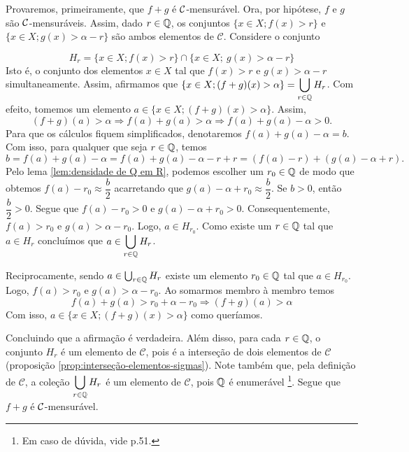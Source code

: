 \begin{prova}
    Provaremos, primeiramente, que $f+g$ é $\operatorname{\mathcal{C}}$-mensurável.
    Ora, por hipótese, $f$ e $g$ são $\operatorname{\mathcal{C}}$-mensuráveis. 
    Assim, dado $r \in \operatorname{\mathbb{Q}}$, os conjuntos $\{x \in X; f(x) > r\}$ e 
    $\{x \in X; g(x) > \alpha -r\}$ são ambos elementos de $\mathcal{C}$.
    Considere o conjunto  
    
    $$H_r = \{x \in X; f(x) > r\} \cap \{x \in X;\ g(x) > \alpha -r\}$$
    Isto é, o conjunto dos elementos $x \in X$ tal que $f(x) 
    > r$ e $g(x) >\alpha -r$ simultaneamente.
    Assim, afirmamos que $\{x \in X; (f+g)(x) > \alpha\} = \displaystyle \bigcup_{r \in \operatorname{\mathbb{Q}}} H_r$. Com efeito, tomemos um elemento 
    $a \in \{x \in X; (f+g)(x) > \alpha\}$.
    Assim, 
    $$
    (f+g)(a) > \alpha 
    \Rightarrow 
    f(a) + g(a) > \alpha 
    \Rightarrow f(a) + g(a) - \alpha > 0. 
    $$
    Para que os cálculos fiquem simplificados, denotaremos $f(a) + g(a) - \alpha = b$.
    Com isso, para qualquer que seja $r \in \operatorname{\mathbb{Q}}$, temos
    $$
    b 
    =
    f(a) + g(a) -\alpha 
    =
    f(a) + g(a) -\alpha - r + r
    =
    (f(a) -r) + (g(a) -\alpha + r).
    $$ 
    Pelo lema \ref{lem:densidade de Q em R}, podemos escolher um $r_0 \in \operatorname{\mathbb{Q}}$ de modo que obtemos $f(a) - r_0 \approx \dfrac{b}{2}$ acarretando que $g(a) -\alpha + r_0 \approx \dfrac{b}{2}$.
    Se $b > 0$, então $\dfrac{b}{2} > 0$.
    Segue que $f(a) - r_0 > 0 $ e $g(a) -\alpha + r_0 > 0$. 
    Consequentemente, $f(a) > r_0  $ e $g(a) > \alpha - r_0$.
    Logo, $a \in H_{r_0}$.
    Como existe um $r \in \operatorname{\mathbb{Q}}$ tal que $a \in H_{r}$ concluímos que $ \displaystyle a \in \bigcup_{r \in \operatorname{\mathbb{Q}}} H_r$.
    
    Reciprocamente, sendo $a \in \bigcup_{r \in \operatorname{\mathbb{Q}}} H_r$ existe um elemento $r_0 \in \operatorname{\mathbb{Q}}$ tal que $a \in H_{r_0}$.
    Logo, $f(a) > r_0$ e $g(a) > \alpha -r_0$.
    Ao somarmos membro à membro temos
    $$
    f(a) + g(a) > r_0 + \alpha -r_0
    \Rightarrow
    (f + g)(a) > \alpha 
    $$
    Com isso, $a \in \{x \in X; (f +g)(x) > \alpha\}$ como queríamos.
    
    Concluindo que a afirmação é verdadeira. 
    Além disso, para cada $r \in \operatorname{\mathbb{Q}}$, o conjunto $H_r$ é um elemento de $\mathcal{C}$, pois é  a interseção de dois elementos de $\mathcal{C}$ (proposição \ref{prop:interseção-elementos-sigmas}).
    Note também que, pela definição de $\mathcal{C}$, a coleção $\displaystyle \bigcup_{r \in \operatorname{\mathbb{Q}}} H_r$ é um elemento de $\mathcal{C}$, pois $\operatorname{\mathbb{Q}}$ é enumerável
    \footnote{Em caso de dúvida, vide \supercite{elon}{p.51}.}.
    Segue que $f+g$ é $\operatorname{\mathcal{C}}$-mensurável.


\end{prova}
